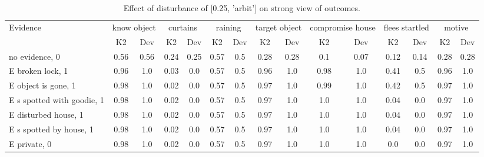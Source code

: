 \begin{table}\begin{tabular}{l|cc|cc|cc|cc|cc|cc|cc}\toprule\multirow{2}{*}{Evidence} & \multicolumn{2}{c}{know object}& \multicolumn{2}{c}{curtains}& \multicolumn{2}{c}{raining}& \multicolumn{2}{c}{target object}& \multicolumn{2}{c}{compromise house}& \multicolumn{2}{c}{flees startled}& \multicolumn{2}{c}{motive}\\& {K2} & {Dev}& {K2} & {Dev}& {K2} & {Dev}& {K2} & {Dev}& {K2} & {Dev}& {K2} & {Dev}& {K2} & {Dev}\\\midrule
no evidence, 0 & 0.56&0.56&0.24&0.25&\cellcolor{Bittersweet}0.57&\cellcolor{Bittersweet}0.5&0.28&0.28&0.1&0.07&0.12&0.14&0.28&0.28\\E broken lock, 1 & 0.96&1.0&0.03&0.0&\cellcolor{Bittersweet}0.57&\cellcolor{Bittersweet}0.5&0.96&1.0&0.98&1.0&\cellcolor{Bittersweet}0.41&\cellcolor{Bittersweet}0.5&0.96&1.0\\E object is gone, 1 & 0.98&1.0&0.02&0.0&\cellcolor{Bittersweet}0.57&\cellcolor{Bittersweet}0.5&0.97&1.0&0.99&1.0&\cellcolor{Bittersweet}0.42&\cellcolor{Bittersweet}0.5&0.97&1.0\\E s spotted with goodie, 1 & 0.98&1.0&0.02&0.0&\cellcolor{Bittersweet}0.57&\cellcolor{Bittersweet}0.5&0.97&1.0&1.0&1.0&0.04&0.0&0.97&1.0\\E disturbed house, 1 & 0.98&1.0&0.02&0.0&\cellcolor{Bittersweet}0.57&\cellcolor{Bittersweet}0.5&0.97&1.0&1.0&1.0&0.04&0.0&0.97&1.0\\E s spotted by house, 1 & 0.98&1.0&0.02&0.0&\cellcolor{Bittersweet}0.57&\cellcolor{Bittersweet}0.5&0.97&1.0&1.0&1.0&0.04&0.0&0.97&1.0\\E private, 0 & 0.98&1.0&0.02&0.0&\cellcolor{Bittersweet}0.57&\cellcolor{Bittersweet}0.5&0.97&1.0&1.0&1.0&0.0&0.0&0.97&1.0\\\bottomrule\end{tabular}\caption{Effect of disturbance of [0.25, 'arbit'] on strong view of outcomes.}\end{table}